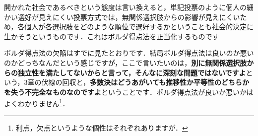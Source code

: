 開かれた社会であるべきという態度は言い換えると，単記投票のように個人の細かい選好が見えにくい投票方式では，無関係選択肢からの影響が見えにくいため，各個人が各選択肢をどのような順位で選好するかということも社会的決定に生かそうというものです．これはボルダ得点法を正当化するものです

ボルダ得点法の欠陥はすでに見たとおりです．結局ボルダ得点法は良いのか悪いのかどっちなんだという感じですが，ここで言いたいのは，{\bf 別に無関係選択肢からの独立性を満たしてないからと言って，そんなに深刻な問題ではないですよ}という，3章の伏線の回収と，{\bf 多数決はどうあがいても推移性か平等性のどちらかを失う不完全なものなのですよ}ということです．ボルダ得点法が良いか悪いかはよくわかりません\footnote{利点，欠点というような個性はそれぞれありますが．}．

